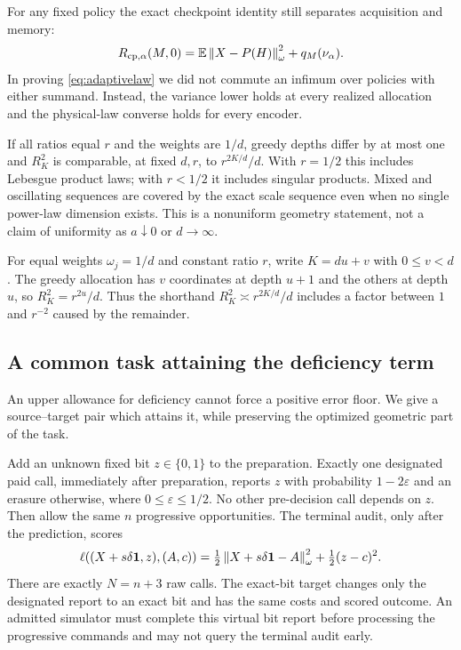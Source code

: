 For any fixed policy the exact checkpoint identity still separates acquisition and memory:
\begin{equation}\label{eq:policyspecific}
 R_{\mathrm{cp},\alpha}(M,0)
 =\mathbb E\left\lVert X-P(H)\right\rVert_\omega^2+q_M(\nu_\alpha).
\end{equation}
In proving \eqref{eq:adaptivelaw} we did not commute an infimum over policies with either summand. Instead, the variance lower holds at every realized allocation and the physical-law converse holds for every encoder.

If all ratios equal $r$ and the weights are $1/d$, greedy depths differ by at most one and $R_K^2$ is comparable, at fixed $d,r$, to $r^{2K/d}/d$. With $r=1/2$ this includes Lebesgue product laws; with $r<1/2$ it includes singular products. Mixed and oscillating sequences are covered by the exact scale sequence even when no single power-law dimension exists. This is a nonuniform geometry statement, not a claim of uniformity as $a\downarrow0$ or $d\to\infty$.

For equal weights $\omega_j=1/d$ and constant ratio $r$, write $K=du+v$ with $0\le v<d$. The greedy allocation has $v$ coordinates at depth $u+1$ and the others at depth $u$, so $R_K^2=r^{2u}/d$. Thus the shorthand $R_K^2\asymp r^{2K/d}/d$ includes a factor between $1$ and $r^{-2}$ caused by the remainder.

\subsection{A common task attaining the deficiency term}
An upper allowance for deficiency cannot force a positive error floor. We give a source--target pair which attains it, while preserving the optimized geometric part of the task.

Add an unknown fixed bit $z\in\{0,1\}$ to the preparation. Exactly one designated paid call, immediately after preparation, reports $z$ with probability $1-2\varepsilon$ and an erasure otherwise, where $0\le\varepsilon\le1/2$. No other pre-decision call depends on $z$. Then allow the same $n$ progressive opportunities. The terminal audit, only after the prediction, scores
\begin{equation}\label{eq:jointtask}
 \ell((X+s\delta\mathbf1,z),(A,c))
 =\tfrac12\left\lVert X+s\delta\mathbf1-A\right\rVert_\omega^2+\tfrac12(z-c)^2.
\end{equation}
There are exactly $N=n+3$ raw calls. The exact-bit target changes only the designated report to an exact bit and has the same costs and scored outcome. An admitted simulator must complete this virtual bit report before processing the progressive commands and may not query the terminal audit early.

